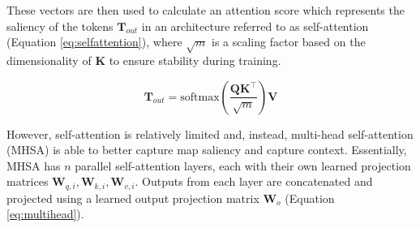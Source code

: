 		
		These vectors are then used to calculate an attention score which represents the saliency of the tokens $\mathbf{T}_{out}$ in an architecture referred to as self-attention (Equation \ref{eq:selfattention}), where $\sqrt m $ is a scaling factor based on the dimensionality of $\mathbf{K}$ to ensure stability during training.
		
		\begin{equation}
			\mathbf{T}_{out} = \mathrm{softmax} \left(\frac{\mathbf{Q}\mathbf{K}^{\top}}{\sqrt m} \right) \mathbf{V}
			\label{eq:selfattention}
		\end{equation}
		
		However, self-attention is relatively limited and, instead, multi-head self-attention (MHSA) is able to better capture map saliency and capture context. Essentially, MHSA has $n$ parallel self-attention layers, each with their own learned projection matrices $\mathbf{W}_{q,i}, \mathbf{W}_{k,i}, \mathbf{W}_{v,i}$. Outputs from each layer are concatenated and projected using a learned output projection matrix $\mathbf{W}_{o}$ (Equation \ref{eq:multihead}). 
		
